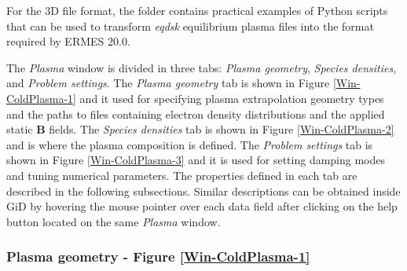 For the 3D file format, the folder  contains practical examples of Python scripts that can be used to transform \textit{eqdsk} equilibrium plasma files into the format required by ERMES 20.0.

The \textit{Plasma} window is divided in three tabs: \textit{Plasma geometry}, \textit{Species densities}, and \textit{Problem settings}. The \textit{Plasma geometry} tab is shown in Figure \ref{Win-ColdPlasma-1} and it used for specifying plasma extrapolation geometry types and the paths to files containing electron density distributions and the applied static \textbf{B} fields. The \textit{Species densities} tab is shown in Figure \ref{Win-ColdPlasma-2} and is where the plasma composition is defined. The \textit{Problem settings} tab is shown in Figure \ref{Win-ColdPlasma-3} and it is used for setting damping modes and tuning numerical parameters. The properties defined in each tab are described in the following subsections. Similar descriptions can be obtained inside GiD by hovering the mouse pointer over each data field after clicking on the help button located on the same \textit{Plasma} window.

\subsubsection{Plasma geometry - Figure \ref{Win-ColdPlasma-1}}\label{PlasmaGeometrySettings}

